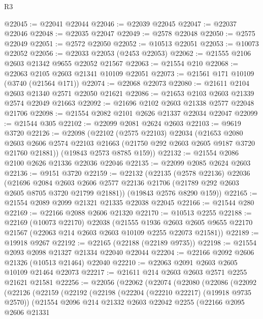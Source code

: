 \begin{lexlean}{R3}
\begin{coremodule}
@22045 := @22041 @22044
@22046 := @22039 @22045
@22047 := @22037 @22046
@22048 := @22035 @22047
@22049 := @2578 @22048
@22050 := @2575 @22049
@22051 := @2572 @22050
@22052 := @10513 @22051
@22053 := @10073 @22052
@22056 := @22033 @22053 (@2453 @22053)
@22062 := @21555 @2106 @2603 @21342 @9655 @22052 @21567
@22063 := @21554 @210
@22068 := @22063 @2105 @2603 @21341 @10109 @22051
@22073 := @21561 @171 @10109 (@3740 (@21564 @171))
@22074 := @22068 @22073
@22080 := @21611 @2104 @2603 @21340 @2571 @22050 @21621
@22086 := @21653 @2103 @2603 @21339 @2574 @22049 @21663
@22092 := @21696 @2102 @2603 @21338 @2577 @22048 @21706
@22098 := @21554 @2082 @2101 @2626 @21337 @22034 @22047
@22099 := @21544 @305
@22102 := @22099 @2081 @2624 @2603
@22103 := @9619 @3720
@22126 := @22098
    (@22102
      (@2575 @22103)
      @22034
      (@21653
        @2080
        @2603
        @2606
        @2574
        @22103
        @21663
        (@21750 @292 @2603 @2605 @9187 @3720 @21760 @21881))
      (@19843 @2573 @8785 @159))
@22132 := @21554 @2086 @2100 @2626 @21336 @22036 @22046
@22135 := @22099 @2085 @2624 @2603
@22136 := @9151 @3720
@22159 := @22132
    (@22135
      (@2578 @22136)
      @22036
      (@21696
        @2084
        @2603
        @2606
        @2577
        @22136
        @21706
        (@21789 @292 @2603 @2605 @8705 @3720 @21799 @21881))
      (@19843 @2576 @8290 @159))
@22165 := @21554 @2089 @2099 @21321 @21335 @22038 @22045
@22166 := @21544 @280
@22169 := @22166 @2088 @2606 @21320
@22170 := @10513 @2255
@22188 := @22169
    (@10073 @22170)
    @22038
    (@21555
      @1936
      @2603
      @2605
      @9655
      @22170
      @21567
      (@22063 @214 @2603 @2603 @10109 @2255 @22073 @21581))
@22189 := @19918 @9267
@22192 := @22165 (@22188 (@22189 @9735))
@22198 := @21554 @2093 @2098 @21327 @21334 @22040 @22044
@22204 := @22166 @2092 @2606 @21326 (@10513 @21464) @22040
@22210 := @22063 @2091 @2603 @2605 @10109 @21464 @22073
@22217 := @21611 @214 @2603 @2603 @2571 @2255 @21621 @21581
@22256 := @22056
    (@22062
      (@22074
        (@22080
          (@22086
            (@22092
              (@22126
                (@22159
                  (@22192
                    (@22198
                      (@22204 (@22210 @22217) (@19918 @9735 @2570))
                      (@21554
                        @2096
                        @214
                        @21332
                        @2603
                        @22042
                        @2255
                        (@22166
                          @2095
                          @2606
                          @21331

\end{coremodule}
\end{lexlean}
